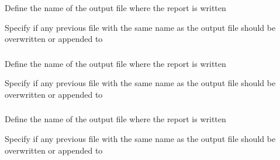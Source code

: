 \subsubsection[Print a summary of the estimated parameters]{}

 {Define the name of the output file where the report is written}

 {Specify if any previous file with the same name as the output file should be overwritten or appended to}

\subsubsection[Print the objective function values]{}

 {Define the name of the output file where the report is written}

 {Specify if any previous file with the same name as the output file should be overwritten or appended to}

\subsubsection[Print the covariance matrix]{}

 {Define the name of the output file where the report is written}

 {Specify if any previous file with the same name as the output file should be overwritten or appended to}

\subsubsection[Print a summary of the an observation, including fits, and residuals]{}

